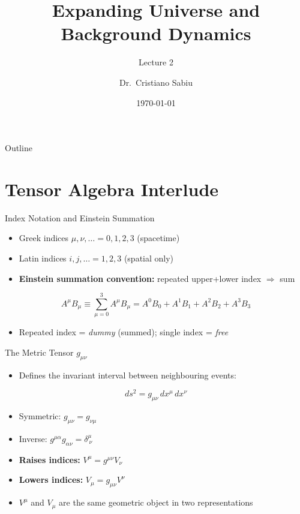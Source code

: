 \documentclass[aspectratio=169,11pt]{beamer}
\title{Expanding Universe and Background Dynamics}
\subtitle{Lecture 2}
\author{Dr.\ Cristiano Sabiu}
\institute{Natural Science Research Institute\\University of Seoul}
\date{\today}
\begin{document}
\begin{frame}[plain]
\titlepage
\end{frame}

\begin{frame}{Outline}
\tableofcontents
\end{frame}


\section{Tensor Algebra Interlude}

\begin{frame}{Index Notation and Einstein Summation}
\begin{itemize}
    \item Greek indices $\mu,\nu,\ldots = 0,1,2,3$ (spacetime)
    \item Latin indices $i,j,\ldots = 1,2,3$ (spatial only)
    \item \textbf{Einstein summation convention:} repeated upper+lower index $\Rightarrow$ sum
\end{itemize}
\begin{equation*}
    A^\mu B_\mu \equiv \sum_{\mu=0}^{3} A^\mu B_\mu
    = A^0 B_0 + A^1 B_1 + A^2 B_2 + A^3 B_3
\end{equation*}
\begin{itemize}
    \item Repeated index = \emph{dummy} (summed); single index = \emph{free}
\end{itemize}
\end{frame}

\begin{frame}{The Metric Tensor $g_{\mu\nu}$}
\begin{itemize}
    \item Defines the invariant interval between neighbouring events:
\end{itemize}
\begin{equation*}
    ds^2 = g_{\mu\nu}\,dx^\mu\,dx^\nu
\end{equation*}
\begin{itemize}
    \item Symmetric: $g_{\mu\nu}=g_{\nu\mu}$
    \item Inverse: $g^{\mu\alpha}g_{\alpha\nu}=\delta^\mu_{\ \nu}$
    \item \textbf{Raises indices:} $V^\mu = g^{\mu\nu}V_\nu$
    \item \textbf{Lowers indices:} $V_\mu = g_{\mu\nu}V^\nu$
    \item $V^\mu$ and $V_\mu$ are the same geometric object in two representations
\end{itemize}
\end{frame}
\end{document}
